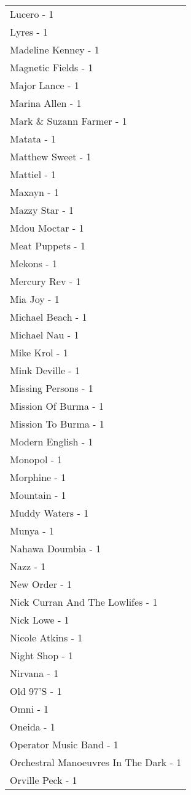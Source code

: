 \documentclass[
]{article}
\begin{document}
\begin{longtable}{l}
Lucero - 1 \\ 
Lyres - 1 \\ 
Madeline Kenney - 1 \\ 
Magnetic Fields - 1 \\ 
Major Lance - 1 \\ 
Marina Allen - 1 \\ 
Mark \& Suzann Farmer - 1 \\ 
Matata - 1 \\ 
Matthew Sweet - 1 \\ 
Mattiel - 1 \\ 
Maxayn - 1 \\ 
Mazzy Star - 1 \\ 
Mdou Moctar - 1 \\ 
Meat Puppets - 1 \\ 
Mekons - 1 \\ 
Mercury Rev - 1 \\ 
Mia Joy - 1 \\ 
Michael Beach - 1 \\ 
Michael Nau - 1 \\ 
Mike Krol - 1 \\ 
Mink Deville - 1 \\ 
Missing Persons - 1 \\ 
Mission Of Burma - 1 \\ 
Mission To Burma - 1 \\ 
Modern English - 1 \\ 
Monopol - 1 \\ 
Morphine - 1 \\ 
Mountain - 1 \\ 
Muddy Waters - 1 \\ 
Munya - 1 \\ 
Nahawa Doumbia - 1 \\ 
Nazz - 1 \\ 
New Order - 1 \\ 
Nick Curran And The Lowlifes - 1 \\ 
Nick Lowe - 1 \\ 
Nicole Atkins - 1 \\ 
Night Shop - 1 \\ 
Nirvana - 1 \\ 
Old 97'S - 1 \\ 
Omni - 1 \\ 
Oneida - 1 \\ 
Operator Music Band - 1 \\ 
Orchestral Manoeuvres In The Dark - 1 \\ 
Orville Peck - 1 \\ 

\end{longtable}
\end{document}
